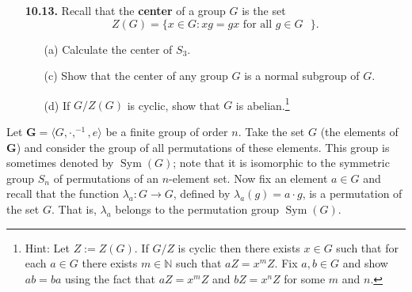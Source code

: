 \documentclass[12pt,reqno]{amsart}
\newcommand{\N}{\ensuremath{\mathbb{N}}}
\newcommand{\bG}{\ensuremath{\mathbf{G}}}
\newcommand{\<}{\ensuremath{\langle}}
\renewcommand{\>}{\ensuremath{\rangle}}
\newcommand{\Sym}{\ensuremath{\operatorname{Sym}}}
\begin{document}
\begin{enumerate}
\medskip
{} 
We will solve this using\\[4pt]
\medskip
\begin{quote}
\emph{Pick an arbitrary element $g\in G$ and show that $gHg^{-1} = H$.}
\end{quote}
\medskip
First, given a subgroup $H\leq G$, and an arbitrary element $g\in G$, it is not hard to
see that the \emph{conjugate of $H$ by $g$}, which is defined by
\[
gHg^{-1} := \{ghg^{-1} | h\in H\},
\]
is also a subgroup of $G$.  Moreover, the function $h \mapsto ghg^{-1}$ is a
bijection.\footnote{In fact, as we will see later, $x\mapsto gxg^{-1}$ 
is an automorphism.}  
Therefore, $|H| = |gHg^{-1}|$.  If $|H| =k$ and if $H$ is the only
subgroup of $G$ of order $k$, then, since $|gHg^{-1}| = k$, we must have 
$H = gHg^{-1}$.
Since $g$ was arbitrary, this proves that $H$ is normal in $G$.
\qed

\bigskip

\item[{\bf 10.13.}]
Recall that the {\bf center} of a group $G$ is the set 
\[
Z(G) = \{ x \in G : xg = gx \text{ for all $g \in G$ } \}.
\]
\begin{enumerate}
 
 \item[(a)]
Calculate the center of $S_3$.
 
 
 \item[(c)]
Show that the center of any group $G$ is a normal subgroup of $G$. 
 
 \item[(d)]
If $G / Z(G)$ is cyclic, show that $G$ is abelian.\footnote{Hint: Let $Z := Z(G)$.  If
  $G/Z$ is cyclic then there exists $x\in G$ such that for each $a\in G$ 
  there exists $m\in \N$ such that $aZ = x^mZ$.
  Fix $a, b\in G$ and show $ab = ba$ using the fact that $aZ = x^mZ$ and
  $bZ = x^nZ$ for some $m$ and $n$.}
 
\end{enumerate}
\medskip
{} 
 
\end{enumerate}

\bigskip

 Let $\bG = \<G, \cdot, ^{-1}, e\>$ be a finite group of order $n$.  
Take the set $G$ (the elements of $\bG$) and consider the group of all
permutations of these elements.  This group is sometimes denoted by $\Sym(G)$;
note that it is isomorphic to the symmetric group $S_n$ of permutations of
an $n$-element set.
Now fix an element $a\in G$ and recall that the function
$\lambda_a: G \rightarrow G$, defined by $\lambda_a(g) = a\cdot g$, is a
permutation of the set $G$.  That is, $\lambda_a$ belongs to the
permutation group $\Sym(G)$.
\end{document}
